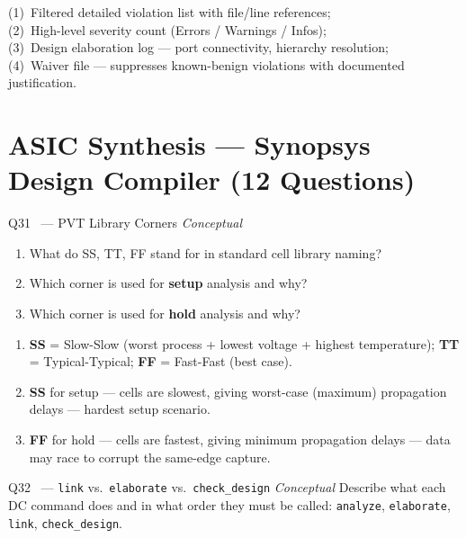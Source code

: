 \documentclass[12pt,a4paper]{article}
\newcommand{\advanced}{%
  \fbox{\textcolor{advred}{\bfseries\sffamily\small ADVANCED}}}
\newcommand{\moderate}{%
  \fbox{\textcolor{modoran}{\bfseries\sffamily\small MODERATE}}}
\begin{document}
\begin{answerbox}
(1)~Filtered detailed violation list with file/line references;\\
(2)~High-level severity count (Errors / Warnings / Infos);\\
(3)~Design elaboration log --- port connectivity, hierarchy resolution;\\
(4)~Waiver file --- suppresses known-benign violations with documented justification.
\end{answerbox}

\section{ASIC Synthesis --- Synopsys Design Compiler (12 Questions)}
\label{sec:synthesis}

\begin{questionbox}{Q31 \moderate\ --- PVT Library Corners \hfill\textit{Conceptual}}
\begin{enumerate}[label=\textbf{\alph*)}]
  \item What do SS, TT, FF stand for in standard cell library naming?
  \item Which corner is used for \textbf{setup} analysis and why?
  \item Which corner is used for \textbf{hold} analysis and why?
\end{enumerate}
\end{questionbox}

\begin{answerbox}
\begin{enumerate}[label=\textbf{\alph*)}]
  \item \textbf{SS} = Slow-Slow (worst process + lowest voltage + highest temperature); \textbf{TT} = Typical-Typical; \textbf{FF} = Fast-Fast (best case).
  \item \textbf{SS} for setup --- cells are slowest, giving worst-case (maximum) propagation delays --- hardest setup scenario.
  \item \textbf{FF} for hold --- cells are fastest, giving minimum propagation delays --- data may race to corrupt the same-edge capture.
\end{enumerate}
\end{answerbox}

\begin{questionbox}{Q32 \advanced\ --- \texttt{link} vs.\ \texttt{elaborate} vs.\ \texttt{check\_design} \hfill\textit{Conceptual}}
Describe what each DC command does and in what order they must be called:
\texttt{analyze}, \texttt{elaborate}, \texttt{link}, \texttt{check\_design}.
\end{questionbox}
\end{document}
